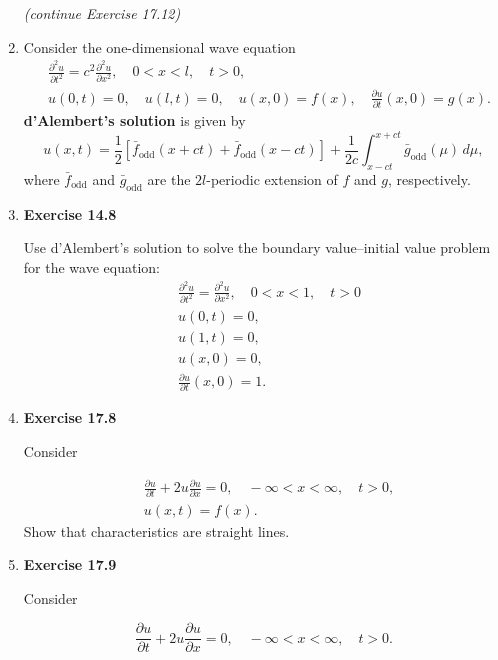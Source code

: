 \begin{enumerate}
\newpage

\textit{(continue Exercise 17.12)}

\newpage

\item Consider the one-dimensional wave equation
\[
\begin{aligned}
& \frac{\partial^{2} u}{\partial t^{2}} = c^{2} \frac{\partial^{2} u}{\partial x^{2}}, \quad 0<x<l, \quad t>0, \\
& u(0,t)=0, \quad  u(l,t)=0, \quad u(x,0)=f(x), \quad \frac{\partial u}{\partial t}(x,0)=g(x).\end{aligned}
\]
\textbf{d'Alembert's solution} is given by
\[u(x,t)= \frac{1}{2}[\bar f_{\text{odd}}(x+ct)+ \bar f_{\text{odd}}(x-ct)] + \frac{1}{2c}\int _{x-ct}^{x+ct} \bar g_{\text{odd}}(\mu)\, d\mu,\]
where $\bar f_{\text{odd}}$ and $\bar g _{\text{odd}}$ are the $2l$-periodic extension of $f$ and $g$, respectively.


\item \textbf{Exercise 14.8}

Use d'Alembert's solution to solve the boundary value--initial value problem for the wave equation:
\[
\begin{aligned}
    & \frac{\partial ^{2}u}{\partial t^{2}} =  \frac{\partial^{2}u}{\partial x^{2}}, \quad 0<x<1, \quad t>0 \\
    & u(0,t)=0, \\
    & u(1,t)=0, \\
    & u(x,0)=0, \\
    & \frac{\partial u}{\partial t}(x,0) = 1.
\end{aligned}
\]

\newpage

\item \textbf{Exercise 17.8}

Consider

\[
\begin{aligned}
& \frac{\partial u}{\partial t} + 2u \frac{\partial u}{\partial x} = 0, \quad -\infty<x<\infty, \quad t>0, \\
& u(x,t)=f(x).
\end{aligned}
\]
Show that characteristics are straight lines.



\newpage

\item \textbf{Exercise 17.9}

Consider

\[\frac{\partial u}{\partial t} + 2u \frac{\partial u}{\partial x} = 0, \quad -\infty<x<\infty, \quad t>0.\]


\end{enumerate}
